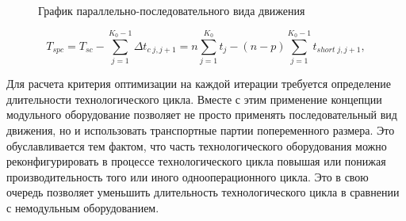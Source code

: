 \begin{figure}[!htb]
	\caption{График параллельно-последовательного вида движения}\label{fig:seq-parallel}
\end{figure}

\begin{equation}
T_{spc} = T_{sc} - \sum_{j=1}^{K_{0}-1}\Delta t_{c \;  j,j+1} = n \sum_{j=1}^{K_0}t_j-(n-p)\sum_{j=1}^{K_{0}-1}t_{short \; j,j+1},
\label{eq:spc}
\end{equation}

Для расчета критерия оптимизации на каждой итерации требуется определение длительности технологического цикла. Вместе с этим применение концепции модульного оборудование позволяет не просто применять последовательный вид движения, но и использовать транспортные партии попеременного размера. Это обуславливается тем фактом, что часть технологического оборудования можно реконфигурировать в процессе технологического цикла повышая или понижая производительность того или иного однооперационного цикла.  Это в свою очередь позволяет уменьшить длительность технологического цикла в сравнении с немодульным оборудованием.


%




